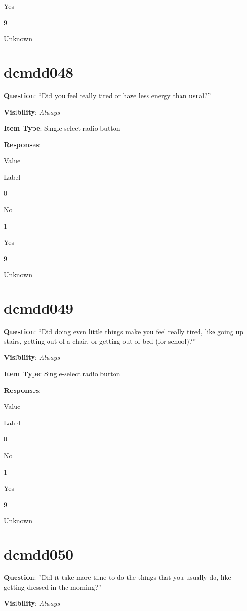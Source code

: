 \documentclass[]{book}
\begin{document}
Yes

9

Unknown

\hypertarget{dcmdd048}{%
\section{dcmdd048}\label{dcmdd048}}

\textbf{Question}: ``Did you feel really tired or have less energy than usual?''

\textbf{Visibility}: \emph{Always}

\textbf{Item Type}: Single-select radio button

\textbf{Responses}:

Value

Label

0

No

1

Yes

9

Unknown

\hypertarget{dcmdd049}{%
\section{dcmdd049}\label{dcmdd049}}

\textbf{Question}: ``Did doing even little things make you feel really tired, like going up stairs, getting out of a chair, or getting out of bed (for school)?''

\textbf{Visibility}: \emph{Always}

\textbf{Item Type}: Single-select radio button

\textbf{Responses}:

Value

Label

0

No

1

Yes

9

Unknown

\hypertarget{dcmdd050}{%
\section{dcmdd050}\label{dcmdd050}}

\textbf{Question}: ``Did it take more time to do the things that you usually do, like getting dressed in the morning?''

\textbf{Visibility}: \emph{Always}
\end{document}
